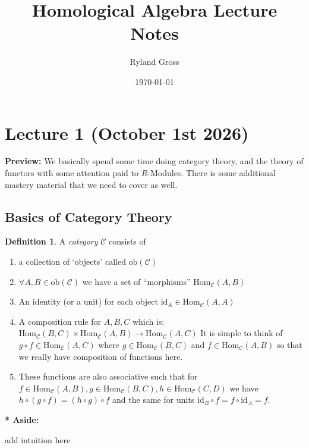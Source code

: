 \documentclass[11pt,a4paper]{article}
\title{Homological Algebra Lecture Notes}
\author{Ryland Gross}
\date{\today}
\newenvironment{asidebar}{%
    \def\FrameCommand{\vrule width 1.5pt \hspace{8pt}}%
    \MakeFramed{\advance\hsize-\width\FrameRestore}%
}{\endMakeFramed}
\newenvironment{aside}{%
    \begin{asidebar}\noindent\textbf{* Aside:}\enspace
}{\end{asidebar}}
\theoremstyle{plain}
\theoremstyle{definition}
\newtheorem{definition}[theorem]{Definition}
\theoremstyle{remark}
\begin{document}
\maketitle

\section{Lecture 1 (October 1st 2026)}

\noindent
\textbf{Preview:} We basically spend some time doing category theory, and the theory of functors with some attention paid to $R$-Modules. There is some additional mastery material that we need to cover as well.

\subsection*{Basics of Category Theory}

\begin{definition}
    A \emph{category} $\mathcal{C}$ consists of 
    \begin{enumerate}
        \item a collection of `objects' called $\text{ob}(\mathcal{C})$
        \item $\forall A, B \in \text{ob}(\mathcal{C})$ we have a set of ``morphisms'' $\text{Hom}_{\mathcal{C}}(A,B)$
        \item An identity (or a unit) for each object $\text{id}_A \in \text{Hom}_{\mathcal{C}}(A,A)$
        \item A composition rule for $A,B,C$ which is: $\text{Hom}_{\mathcal{C}}(B,C) \times \text{Hom}_{\mathcal{C}}(A,B) \to \text{Hom}_{\mathcal{C}}(A,C)$ It is simple to think of $g \circ f \in \text{Hom}_{\mathcal{C}}(A,C)$ where $g \in \text{Hom}_{\mathcal{C}}(B,C)$ and $f \in \text{Hom}_{\mathcal{C}}(A,B)$ so that we really have composition of functions here. 
        \item These functions are also associative such that for $f \in \text{Hom}_{\mathcal{C}}(A,B), g \in \text{Hom}_{\mathcal{C}}(B,C), h \in \text{Hom}_{\mathcal{C}}(C,D)$ we have $h \circ (g \circ f) = (h \circ g) \circ f$ and the same for units $\text{id}_B \circ f = f \circ \text{id}_A = f$.
    \end{enumerate}
\end{definition}

\begin{aside}
add intuition here
\end{aside}
\end{document}
